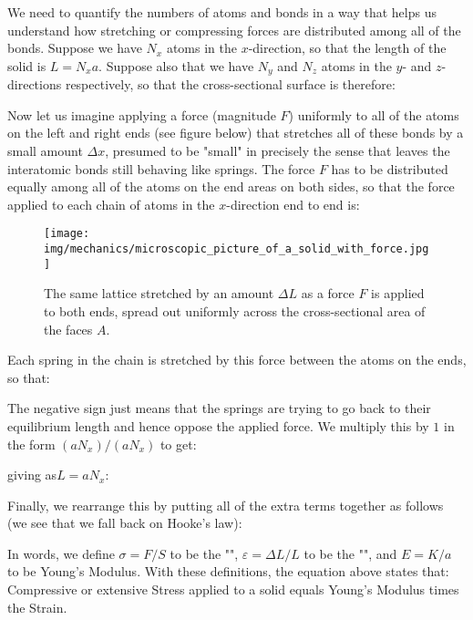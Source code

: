 	We need to quantify the numbers of atoms and bonds in a way that helps us understand how stretching or compressing forces are distributed among all of the bonds. Suppose we have $N_x$ atoms in the $x$-direction, so that the length of the solid is $L = N_xa$. Suppose also that we have $N_y$ and $N_z$ atoms in the $y$- and $z$-directions respectively, so that the cross-sectional surface is therefore:
	
	Now let us imagine applying a force (magnitude $F$) uniformly to all of the atoms on the left and right ends (see figure below) that stretches all of these bonds by a small amount $\Delta x$, presumed to be "small" in precisely the sense that leaves the interatomic bonds still behaving like springs. The force $F$ has to be distributed equally among all of the atoms on the end areas on both sides, so that the force applied to each chain of atoms in the $x$-direction end to end is:
	
	\begin{figure}[H]
		\centering
		\texttt{[image: img/mechanics/microscopic\_picture\_of\_a\_solid\_with\_force.jpg]}
		\caption[]{The same lattice stretched by an amount $\Delta L$ as a force $F$ is applied to both ends, spread out uniformly across the cross-sectional area of the faces $A$.}
	\end{figure}
	Each spring in the chain is stretched by this force between the atoms on the ends, so that:
	
	The negative sign just means that the springs are trying to go back to their equilibrium length and
hence oppose the applied force. We multiply this by $1$ in the form $(aN_x)/(aN_x)$ to get:
	
	giving as$L=aN_x$:
	
	Finally, we rearrange this by putting all of the extra terms together as follows (we see that we fall back on Hooke's law):
	
	In words, we define $\sigma=F/S$ to be the "", $\varepsilon=\Delta L/L$ to be the "", and $E = K/a$ to be Young's Modulus. With these definitions, the equation above states that: Compressive or extensive Stress applied to a solid equals Young's Modulus times the Strain.
	
